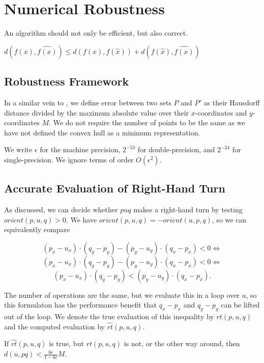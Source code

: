 \section{Numerical Robustness}

An algorithm should not only be efficient, but also correct. 

$d(f(x), \widehat{f(x)}) \leq d(f(x), f(\hat{x})) + d(f(\hat{x}), \widehat{f(x)})$

\subsection{Robustness Framework}

In a similar vein to \cite{Jiang06}, we define error between two sets
$P$ and $P'$ as their Hausdorff distance divided by the maximum absolute
value over their $x$-coordinates and $y$-coordinates $M$. We do not require
the number of points to be the same as we have not defined the convex hull
as a minimum representation. 

We write $\epsilon$ for the machine precision, $2^{-53}$ for double-precision, 
and $2^{-24}$ for single-precision. We ignore terms of order $O(\epsilon^2)$.

\subsection{Accurate Evaluation of Right-Hand Turn}

As discussed, we can decide whether $puq$ makes a right-hand turn by testing
$orient(p, u, q) > 0$. We have $orient(p, u, q) = -orient(u, p, q)$, so
we can equivalently compare

$$(p_x - u_x) \cdot (q_y - p_y) - (p_y - u_y) \cdot (q_x - p_x) < 0 \iff$$
$$(p_x - u_x) \cdot (q_y - p_y) - (p_y - u_y) \cdot (q_x - p_x) < 0 \iff$$
$$(p_x - u_x) \cdot (q_y - p_y) < (p_y - u_y) \cdot (q_x - p_x).$$

The number of operations are the same, but we evaluate this in a loop over $u$, 
so this formulaton has the performance benefit that $q_x - p_x$ and $q_y - p_y$ 
can be lifted out of the loop. We denote the true evaluation of this inequality
by $rt(p, u, q)$ and the computed evaluation by $\widehat{rt}(p, u, q)$.

\begin{lemma}\label{lem:right-turn}
    If $\widehat{rt}(p, u, q)$ is true, but $rt(p, u, q)$ is not, or the
    other way around, then $d(u, pq) < \frac{6\epsilon}{1 - 6\epsilon}M$.
\end{lemma}

